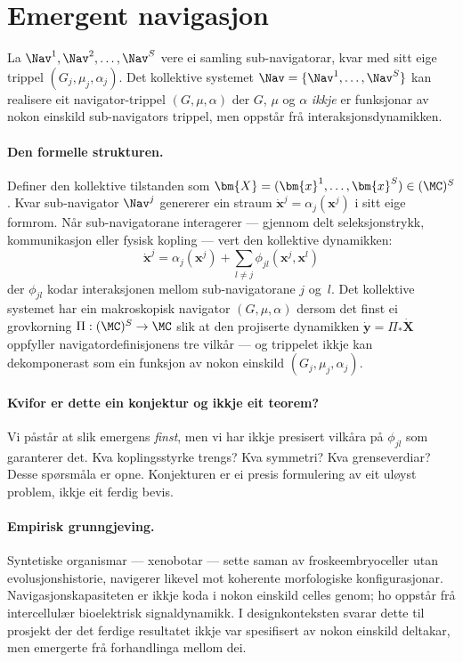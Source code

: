 \section{Emergent navigasjon}

\begin{konmark}\label{conj:L.7.3}
La $\Nav^1, \Nav^2, \ldots, \Nav^S$ vere ei samling
sub-navigatorar, kvar med sitt eige trippel
$(G_j, \mu_j, \alpha_j)$. Det kollektive systemet
$\Nav = \{\Nav^1, \ldots, \Nav^S\}$ kan realisere eit
navigator-trippel $(G, \mu, \alpha)$ der $G$, $\mu$ og $\alpha$
\emph{ikkje} er funksjonar av nokon einskild sub-navigators
trippel, men oppstår frå interaksjonsdynamikken.
\end{konmark}

\paragraph{Den formelle strukturen.}
Definer den kollektive tilstanden som
$\bm{X} = (\bm{x}^1, \ldots, \bm{x}^S) \in (\MC)^S$.
Kvar sub-navigator $\Nav^j$ genererer ein straum
$\dot{\bm{x}}^j = \alpha_j(\bm{x}^j)$ i sitt eige formrom.
Når sub-navigatorane interagerer --- gjennom delt seleksjonstrykk,
kommunikasjon eller fysisk kopling --- vert den kollektive
dynamikken:
\[
  \dot{\bm{x}}^j = \alpha_j(\bm{x}^j)
  + \sum_{l \neq j} \phi_{jl}(\bm{x}^j, \bm{x}^l)
\]
der $\phi_{jl}$ kodar interaksjonen mellom sub-navigatorane $j$
og~$l$. Det kollektive systemet har ein makroskopisk navigator
$(G, \mu, \alpha)$ dersom det finst ei grovkorning
$\Pi : (\MC)^S \to \MC$ slik at den projiserte dynamikken
$\dot{\bm{y}} = \Pi_* \dot{\bm{X}}$ oppfyller
navigatordefinisjonens tre vilkår --- og trippelet ikkje kan
dekomponerast som ein funksjon av nokon einskild
$(G_j, \mu_j, \alpha_j)$.

\paragraph{Kvifor er dette ein konjektur og ikkje eit teorem?}
Vi påstår at slik emergens \emph{finst}, men vi har ikkje
presisert vilkåra på $\phi_{jl}$ som garanterer det. Kva
koplingsstyrke trengs? Kva symmetri? Kva grenseverdiar? Desse
spørsmåla er opne. Konjekturen er ei presis formulering av eit
uløyst problem, ikkje eit ferdig bevis.

\paragraph{Empirisk grunngjeving.}
Syntetiske organismar --- xenobotar --- sette saman av
froskeembryoceller utan evolusjonshistorie, navigerer likevel mot
koherente morfologiske konfigurasjonar. Navigasjonskapasiteten er
ikkje koda i nokon einskild celles genom; ho oppstår frå
intercellulær bioelektrisk signaldynamikk. I designkonteksten
svarar dette til prosjekt der det ferdige resultatet ikkje var
spesifisert av nokon einskild deltakar, men emergerte frå
forhandlinga mellom dei.

